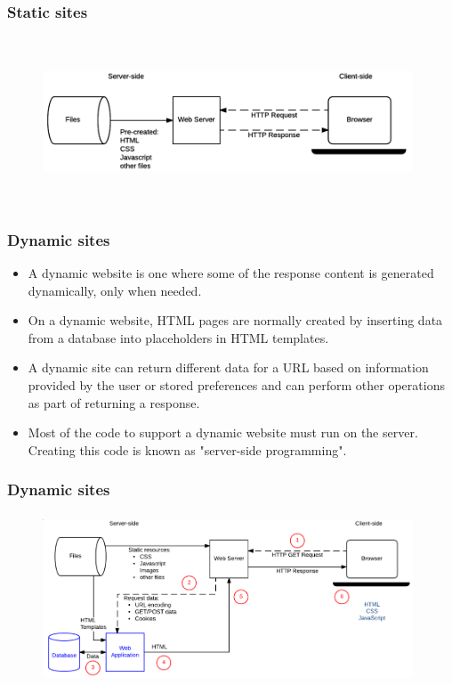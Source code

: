 \documentclass{beamer}
\begin{document}
\begin{frame}
\frametitle{Static sites}
\begin{figure}
	    \centering
	    \includegraphics[height=5cm,width=11cm]{l1.png}
	\end{figure}
\end{frame}
\begin{frame}
\frametitle{Dynamic sites}
\begin{itemize}
    \item A dynamic website is one where some of the response content is generated dynamically, only when needed. 
    \item On a dynamic website, HTML pages are normally created by inserting data from a database into placeholders in HTML templates.
\item A dynamic site can return different data for a URL based on information provided by the user or stored preferences and can perform other operations as part of returning a response.
\item Most of the code to support a dynamic website must run on the server. Creating this code is known as "server-side programming".
\end{itemize}
\end{frame}
\begin{frame}
\frametitle{Dynamic sites}
\begin{figure}
	    \centering
	    \includegraphics[height=5cm,width=11cm]{l2.png}
	\end{figure}
\end{frame}
\end{document}
